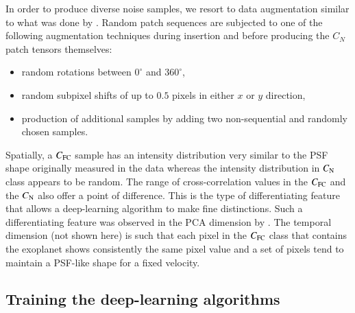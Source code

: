 \documentclass{aa}
\begin{document}
In order to produce diverse noise samples, we resort to data augmentation similar to what was done by \cite{2018Gomez}.
Random patch sequences are subjected to one of the following augmentation techniques during insertion and before producing the $C_{N}$ patch tensors themselves:
\begin{itemize}
    \item random rotations between $0^{\circ}$ and $360^{\circ}$,
    \item random subpixel shifts of up to $0.5$ pixels in either $x$ or $y$ direction,
    \item production of additional samples by adding two non-sequential and randomly chosen samples.
\end{itemize}
Spatially, a $C_{\rm FC}$ sample has an intensity distribution very similar to the PSF shape originally measured in the data whereas the intensity distribution in $C_{\rm N}$ class appears to be random.
The range of cross-correlation values in the $C_{\rm FC}$ and the $C_{\rm N}$ also offer a point of difference.
This is the type of differentiating feature that allows a deep-learning algorithm to make fine distinctions.
Such a differentiating feature was observed in the PCA dimension by \citet{2018Gomez}.
The temporal dimension (not shown here) is such that each pixel in the $C_{\rm FC}$ class that contains the exoplanet shows consistently the same pixel value and a set of pixels tend to maintain a PSF-like shape for a fixed velocity. 
\subsection{Training the deep-learning algorithms}
\end{document}

